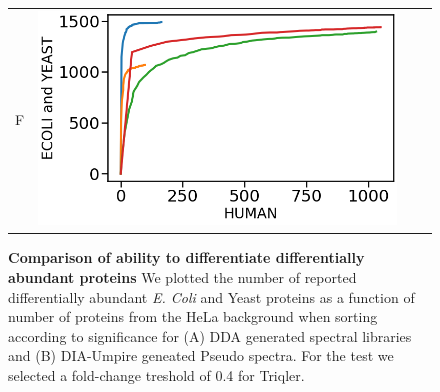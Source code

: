 \documentclass[11pt]{article}
\begin{document}
\begin{figure}[hbt]
\begin{tabular}{lclc}
        F & \includegraphics[width=0.45\linewidth]{../../result/report_plots/diann_de_human_vs_ecoli_and_yeast.png} \\ 

    \end{tabular}
    \caption{{\bf Comparison of ability to differentiate differentially abundant proteins} We plotted the number of reported differentially abundant  {\em E. Coli} and Yeast proteins as a function of number of proteins from the HeLa background when sorting according to significance for (A) DDA generated spectral libraries and (B) DIA-Umpire geneated Pseudo spectra. For the test we selected a fold-change treshold of 0.4 for Triqler. \label{fig:diff_vs_hela}}
\end{figure}
\end{document}

